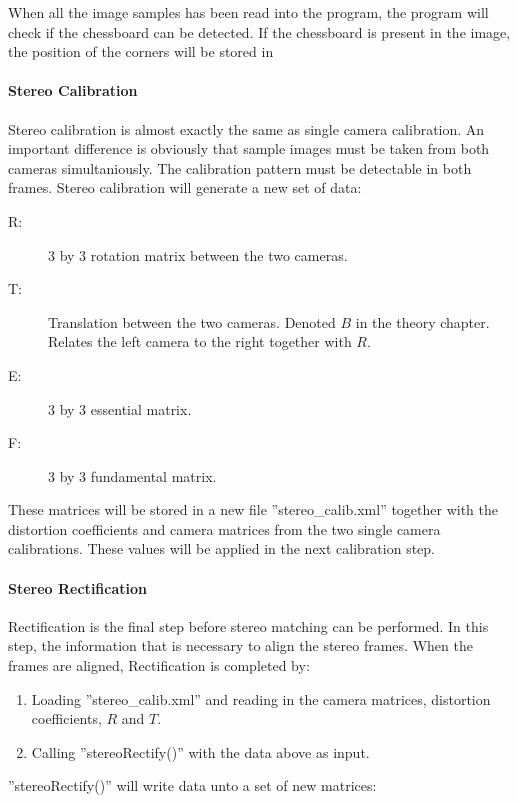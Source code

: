 When all the image samples has been read into the program, the program will check if the chessboard can be detected. If the chessboard is present in the image, the position of the corners will be stored in  

\paragraph{Stereo Calibration}

Stereo calibration is almost exactly the same as single camera calibration. An important difference is obviously that sample images must be taken from both cameras simultaniously. The calibration pattern must be detectable in both frames. Stereo calibration will generate a new set of data:

\begin{description}
	\item[R: ] 3 by 3 rotation matrix between the two cameras.
	\item[T: ] Translation between the two cameras. Denoted $B$ in the theory chapter. Relates the left camera to the right together with $R$. 
	\item[E: ] 3 by 3 essential matrix.
	\item[F: ] 3 by 3 fundamental matrix.
\end{description}

These matrices will be stored in a new file ''stereo\_calib.xml'' together with the distortion coefficients and camera matrices from the two single camera calibrations. These values will be applied in the next calibration step.

\paragraph{Stereo Rectification}

Rectification is the final step before stereo matching can be performed. In this step, the information that is necessary to align the stereo frames. When the frames are aligned, Rectification is completed by:

\begin{enumerate}
	\item Loading ''stereo\_calib.xml'' and reading in the camera matrices, distortion coefficients, $R$ and $T$.
	\item Calling ''stereoRectify()'' with the data above as input.
\end{enumerate}

 ''stereoRectify()'' will write data unto a set of new matrices:

